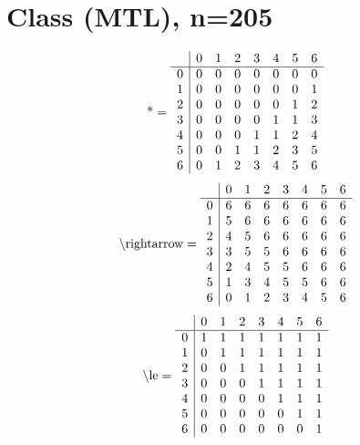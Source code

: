 \documentclass[11pt]{article}
\begin{document}
\section{Class (MTL), n=205}
\[\text{*} = 
\begin{array}{r | r r r r r r r}
 & 0 & 1 & 2 & 3 & 4 & 5 & 6 \\ \hline
0 & 0 & 0 & 0 & 0 & 0 & 0 & 0 \\
1 & 0 & 0 & 0 & 0 & 0 & 0 & 1 \\
2 & 0 & 0 & 0 & 0 & 0 & 1 & 2 \\
3 & 0 & 0 & 0 & 0 & 1 & 1 & 3 \\
4 & 0 & 0 & 0 & 1 & 1 & 2 & 4 \\
5 & 0 & 0 & 1 & 1 & 2 & 3 & 5 \\
6 & 0 & 1 & 2 & 3 & 4 & 5 & 6 \\
\end{array}
\]
\[\text{\textbackslash rightarrow} = 
\begin{array}{r | r r r r r r r}
 & 0 & 1 & 2 & 3 & 4 & 5 & 6 \\ \hline
0 & 6 & 6 & 6 & 6 & 6 & 6 & 6 \\
1 & 5 & 6 & 6 & 6 & 6 & 6 & 6 \\
2 & 4 & 5 & 6 & 6 & 6 & 6 & 6 \\
3 & 3 & 5 & 5 & 6 & 6 & 6 & 6 \\
4 & 2 & 4 & 5 & 5 & 6 & 6 & 6 \\
5 & 1 & 3 & 4 & 5 & 5 & 6 & 6 \\
6 & 0 & 1 & 2 & 3 & 4 & 5 & 6 \\
\end{array}
\]
\[\text{\textbackslash le} = 
\begin{array}{r | r r r r r r r}
 & 0 & 1 & 2 & 3 & 4 & 5 & 6 \\ \hline
0 & 1 & 1 & 1 & 1 & 1 & 1 & 1 \\
1 & 0 & 1 & 1 & 1 & 1 & 1 & 1 \\
2 & 0 & 0 & 1 & 1 & 1 & 1 & 1 \\
3 & 0 & 0 & 0 & 1 & 1 & 1 & 1 \\
4 & 0 & 0 & 0 & 0 & 1 & 1 & 1 \\
5 & 0 & 0 & 0 & 0 & 0 & 1 & 1 \\
6 & 0 & 0 & 0 & 0 & 0 & 0 & 1 \\
\end{array}
\]
\end{document}
